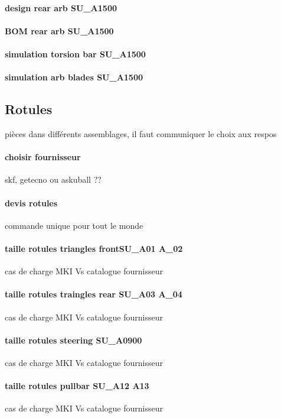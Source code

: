 		\paragraph{design rear arb SU\_A1500} 
		\paragraph{BOM rear arb SU\_A1500} 
		\paragraph{simulation torsion bar SU\_A1500} 
		\paragraph{simulation arb blades SU\_A1500} 
	\subsection*{Rotules} 
 \par pièces dans différents assemblages, il faut communiquer le choix aux respos
		\paragraph{choisir fournisseur} skf, getecno ou askuball ??
		\paragraph{devis rotules} commande unique pour tout le monde
		\paragraph{taille rotules triangles frontSU\_A01 A\_02} cas de charge MKI Vs catalogue fournisseur
		\paragraph{taille rotules traingles rear SU\_A03 A\_04} cas de charge MKI Vs catalogue fournisseur
		\paragraph{taille rotules steering SU\_A0900} cas de charge MKI Vs catalogue fournisseur
		\paragraph{taille rotules pullbar SU\_A12 A13} cas de charge MKI Vs catalogue fournisseur
\newpage 
